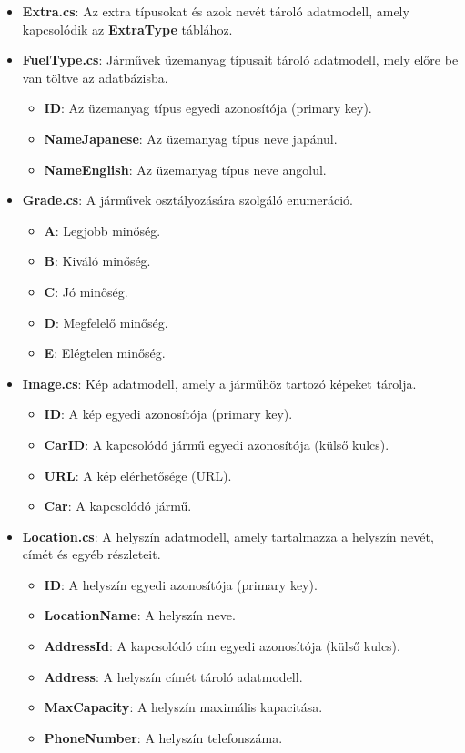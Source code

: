 \documentclass{report}[11pt]
\begin{document}
\begin{itemize}
\begin{itemize}
\end{itemize}
\item \textbf{Extra.cs}: Az extra típusokat és azok nevét tároló adatmodell, amely kapcsolódik az \textbf{ExtraType} táblához.
\item \textbf{FuelType.cs}: Járművek üzemanyag típusait tároló adatmodell, mely előre be van töltve az adatbázisba.
\begin{itemize}
    \item \textbf{ID}: Az üzemanyag típus egyedi azonosítója (primary key).
    \item \textbf{NameJapanese}: Az üzemanyag típus neve japánul.
    \item \textbf{NameEnglish}: Az üzemanyag típus neve angolul.
\end{itemize}


\item \textbf{Grade.cs}: A járművek osztályozására szolgáló enumeráció.
\begin{itemize}
    \item \textbf{A}: Legjobb minőség.
    \item \textbf{B}: Kiváló minőség.
    \item \textbf{C}: Jó minőség.
    \item \textbf{D}: Megfelelő minőség.
    \item \textbf{E}: Elégtelen minőség.
\end{itemize}

\item \textbf{Image.cs}: Kép adatmodell, amely a járműhöz tartozó képeket tárolja.
\begin{itemize}
    \item \textbf{ID}: A kép egyedi azonosítója (primary key).
    \item \textbf{CarID}: A kapcsolódó jármű egyedi azonosítója (külső kulcs).
    \item \textbf{URL}: A kép elérhetősége (URL).
    \item \textbf{Car}: A kapcsolódó jármű.
\end{itemize}

\item \textbf{Location.cs}: A helyszín adatmodell, amely tartalmazza a helyszín nevét, címét és egyéb részleteit.
\begin{itemize}
    \item \textbf{ID}: A helyszín egyedi azonosítója (primary key).
    \item \textbf{LocationName}: A helyszín neve.
    \item \textbf{AddressId}: A kapcsolódó cím egyedi azonosítója (külső kulcs).
    \item \textbf{Address}: A helyszín címét tároló adatmodell.
    \item \textbf{MaxCapacity}: A helyszín maximális kapacitása.
    \item \textbf{PhoneNumber}: A helyszín telefonszáma.
\end{itemize}


\end{itemize}
\end{document}
